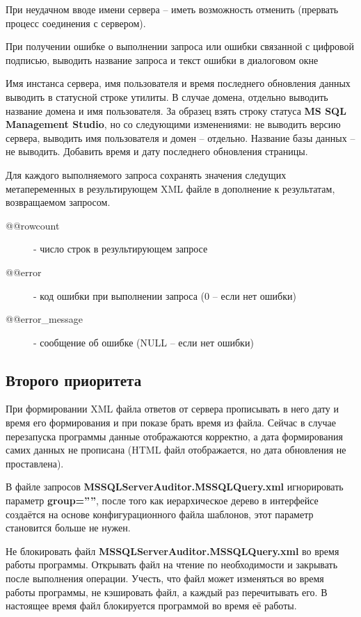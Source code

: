 \documentclass[10pt,a4paper]{article}
\begin{document}
При неудачном вводе имени сервера – иметь возможность отменить (прервать
процесс соединения с сервером).

При получении ошибке о выполнении запроса или ошибки связанной с цифровой
подписью, выводить название запроса и текст ошибки в диалоговом окне

Имя инстанса сервера, имя пользователя и время последнего обновления данных
выводить в статусной строке утилиты. В случае домена, отдельно выводить название
домена и имя пользователя. За образец взять строку статуса \textbf{MS SQL
Management Studio}, но со следующими изменениями: не выводить версию сервера,
выводить имя пользователя и домен – отдельно. Название базы данных – не
выводить. Добавить время и дату последнего обновления страницы.

Для каждого выполняемого запроса сохранять значения следущих метапеременных в
результирующем XML файле в дополнение к результатам, возвращаемом запросом.

\begin{description}
	\item[@@rowcount] - число строк в результирующем запросе

	\item[@@error] - код ошибки при выполнении запроса (0 – если нет ошибки)

	\item[@@error\_message] - сообщение об ошибке (NULL – если нет ошибки)
\end{description}

\subsection{Второго приоритета}

При формировании XML файла ответов от сервера прописывать в него дату и время
его формирования и при показе брать время из файла. Сейчас в случае перезапуска
программы данные отображаются корректно, а дата формирования самих данных не
прописана (HTML файл отображается, но дата обновления не проставлена).

В файле запросов \textbf{MSSQLServerAuditor.MSSQLQuery.xml} игнорировать
параметр \textbf{group=””}, после того как иерархическое дерево в интерфейсе
создаётся на основе конфигурационного файла шаблонов, этот параметр становится
больше не нужен.

Не блокировать файл \textbf{MSSQLServerAuditor.MSSQLQuery.xml}
во время работы программы. Открывать файл на чтение по необходимости и закрывать
после выполнения операции. Учесть, что файл может изменяться во время работы
программы, не кэшировать файл, а каждый раз перечитывать его. В настоящее время
файл блокируется программой во время её работы.
\end{document}
